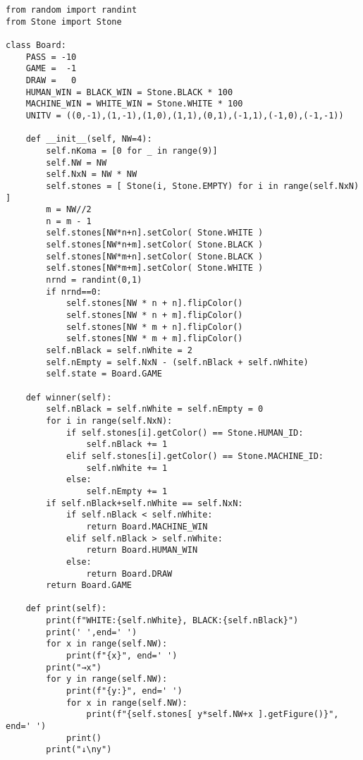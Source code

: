 \documentclass[uplatex,a4paper,11pt,oneside,openany]{jsbook}
\begin{document}
\begin{lstlisting}[caption=Board class,label=othello05]
from random import randint
from Stone import Stone

class Board:
    PASS = -10
    GAME =  -1
    DRAW =   0
    HUMAN_WIN = BLACK_WIN = Stone.BLACK * 100
    MACHINE_WIN = WHITE_WIN = Stone.WHITE * 100
    UNITV = ((0,-1),(1,-1),(1,0),(1,1),(0,1),(-1,1),(-1,0),(-1,-1))

    def __init__(self, NW=4):
        self.nKoma = [0 for _ in range(9)]
        self.NW = NW
        self.NxN = NW * NW
        self.stones = [ Stone(i, Stone.EMPTY) for i in range(self.NxN) ]
        m = NW//2
        n = m - 1
        self.stones[NW*n+n].setColor( Stone.WHITE )
        self.stones[NW*n+m].setColor( Stone.BLACK )
        self.stones[NW*m+n].setColor( Stone.BLACK )
        self.stones[NW*m+m].setColor( Stone.WHITE )
        nrnd = randint(0,1)
        if nrnd==0:
            self.stones[NW * n + n].flipColor()
            self.stones[NW * n + m].flipColor()
            self.stones[NW * m + n].flipColor()
            self.stones[NW * m + m].flipColor()
        self.nBlack = self.nWhite = 2
        self.nEmpty = self.NxN - (self.nBlack + self.nWhite)
        self.state = Board.GAME

    def winner(self):
        self.nBlack = self.nWhite = self.nEmpty = 0
        for i in range(self.NxN):
            if self.stones[i].getColor() == Stone.HUMAN_ID:
                self.nBlack += 1
            elif self.stones[i].getColor() == Stone.MACHINE_ID:
                self.nWhite += 1
            else:
                self.nEmpty += 1
        if self.nBlack+self.nWhite == self.NxN:
            if self.nBlack < self.nWhite:
                return Board.MACHINE_WIN
            elif self.nBlack > self.nWhite:
                return Board.HUMAN_WIN
            else:
                return Board.DRAW
        return Board.GAME

    def print(self):
        print(f"WHITE:{self.nWhite}, BLACK:{self.nBlack}")
        print(' ',end=' ')
        for x in range(self.NW):
            print(f"{x}", end=' ')
        print("→x")
        for y in range(self.NW):
            print(f"{y:}", end=' ')
            for x in range(self.NW):
                print(f"{self.stones[ y*self.NW+x ].getFigure()}", end=' ')
            print()
        print("↓\ny")


\end{lstlisting}
\end{document}
